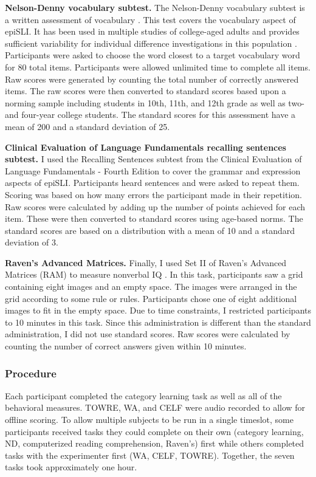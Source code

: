 \documentclass[../dissertation.tex]{subfiles}
\begin{document}
	\textbf{Nelson-Denny vocabulary subtest.} The Nelson-Denny vocabulary subtest is a written assessment of vocabulary \citep{Brown1981}. This test covers the vocabulary aspect of epiSLI. It has been used in multiple studies of college-aged adults and provides sufficient variability for individual difference investigations in this population \citetext{e.g., \citealt{Boudewyn2015}; \citealt{Stafura2014}}. Participants were asked to choose the word closest to a target vocabulary word for 80 total items. Participants were allowed unlimited time to complete all items. Raw scores were generated by counting the total number of correctly answered items. The raw scores were then converted to standard scores based upon a norming sample including students in 10th, 11th, and 12th grade as well as two- and four-year college students. The standard scores for this assessment have a mean of 200 and a standard deviation of 25. \par
	\textbf{Clinical Evaluation of Language Fundamentals recalling sentences subtest.} I used the Recalling Sentences subtest from the Clinical Evaluation of Language Fundamentals - Fourth Edition \citetext{CELF; \citealt{Semel2006}} to cover the grammar and expression aspects of epiSLI. Participants heard sentences and were asked to repeat them. Scoring was based on how many errors the participant made in their repetition. Raw scores were calculated by adding up the number of points achieved for each item. These were then converted to standard scores using age-based norms. The standard scores are based on a distribution with a mean of 10 and a standard deviation of 3. \par
	\textbf{Raven's Advanced Matrices.} Finally, I used Set II of Raven's Advanced Matrices (RAM) to measure nonverbal IQ \citep{Raven1998}. In this task, participants saw a grid containing eight images and an empty space. The images were arranged in the grid according to some rule or rules. Participants chose one of eight additional images to fit in the empty space. Due to time constraints, I restricted participants to 10 minutes in this task. Since this administration is different than the standard administration, I did not use standard scores. Raw scores were calculated by counting the number of correct answers given within 10 minutes.

\subsubsection{Procedure}
	Each participant completed the category learning task as well as all of the behavioral measures. TOWRE, WA, and CELF were audio recorded to allow for offline scoring. To allow multiple subjects to be run in a single timeslot, some participants received tasks they could complete on their own (category learning, ND, computerized reading comprehension, Raven's) first while others completed tasks with the experimenter first (WA, CELF, TOWRE). Together, the seven tasks took approximately one hour.
	
\end{document}
